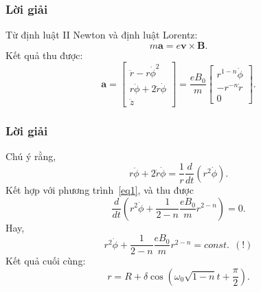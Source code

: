\begin{frame}
    \frametitle{Lời giải}
    Từ định luật II Newton và định luật Lorentz: \[m\mathbf{a}=e\mathbf{v}\times\mathbf{B}.\]
    Kết quả thu được: 
    \begin{equation}\label{eq1}
    \mathbf{a}=\begin{bmatrix}
        \ddot{r}-r\dot{\phi}^2\\
        r\ddot{\phi}+2\dot{r}\dot{\phi}\\
        \ddot{z}
    \end{bmatrix}=\frac{eB_0}{m}\begin{bmatrix}
        r^{1-n}\dot\phi\\
        -r^{-n}\dot{r}\\
        0
    \end{bmatrix}.
    \end{equation}
\end{frame}
\begin{frame}
    \frametitle{Lời giải}
    Chú ý rằng, \[r\ddot{\phi}+2\dot{r}\dot{\phi}=\frac{1}{r}\frac{d}{dt}(r^2 \dot\phi).\]
    Kết hợp với phương trình~\eqref{eq1}, và thu được
    \[\frac{d}{dt}\left(r^2\dot\phi +\frac{1}{2-n}\frac{eB_0}{m}r^{2-n}\right)=0.\]
    Hay, \[r^2\dot\phi +\frac{1}{2-n}\frac{eB_0}{m}r^{2-n}=const.~~(!)\]
    Kết quả cuối cùng: \begin{equation}
        r=R+\delta\cos\left(\omega_0\sqrt{1-n} t+\frac{\pi}{2}\right).
    \end{equation}
\end{frame}

